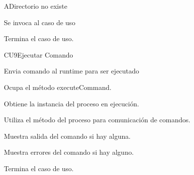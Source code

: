 
	\begin{UCtrayectoriaA}{A}{Directorio no existe}

		\UCpaso[\UCsist] Se invoca al caso de uso 

		\UCpaso[] Termina el caso de uso.

	\end{UCtrayectoriaA}


	\begin{UseCase}{CU9}{Ejecutar Comando}{

		Envia comando al runtime para ser ejecutado

	}















	\end{UseCase}


	\begin{UCtrayectoria}

		\UCpaso[\UCactor] Ocupa el método executeCommand.

		\UCpaso[\UCsist] Obtiene la instancia del proceso en ejecución.

		\UCpaso[\UCsist] Utiliza el método del proceso para comunicación de comandos.

		\UCpaso[\UCsist] Muestra salida del comando si hay alguna.

		\UCpaso[\UCsist] Muestra errores del comando si hay alguno.

		\UCpaso[] Termina el caso de uso.

	\end{UCtrayectoria}



